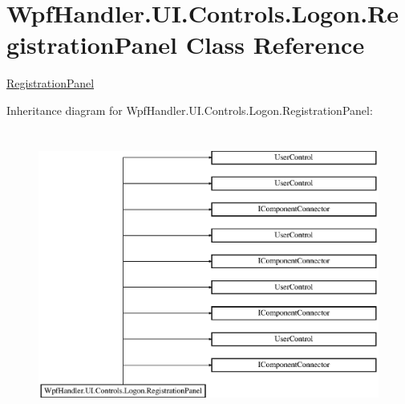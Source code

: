 \hypertarget{class_wpf_handler_1_1_u_i_1_1_controls_1_1_logon_1_1_registration_panel}{}\section{Wpf\+Handler.\+U\+I.\+Controls.\+Logon.\+Registration\+Panel Class Reference}
\label{class_wpf_handler_1_1_u_i_1_1_controls_1_1_logon_1_1_registration_panel}


\mbox{\hyperlink{class_wpf_handler_1_1_u_i_1_1_controls_1_1_logon_1_1_registration_panel}{Registration\+Panel}}  


Inheritance diagram for Wpf\+Handler.\+U\+I.\+Controls.\+Logon.\+Registration\+Panel\+:\begin{figure}[H]
\begin{center}
\leavevmode
\includegraphics[height=9.523809cm]{d8/d0b/class_wpf_handler_1_1_u_i_1_1_controls_1_1_logon_1_1_registration_panel}
\end{center}
\end{figure}
